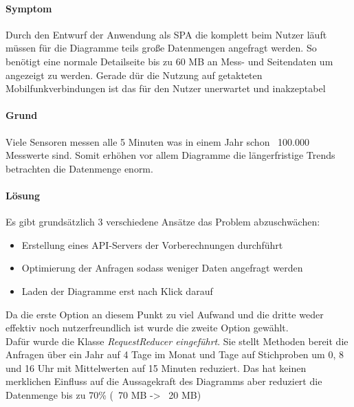 \paragraph{Symptom}
Durch den Entwurf der Anwendung als SPA die komplett beim Nutzer läuft müssen für die Diagramme teils große
Datenmengen angefragt werden. So benötigt eine normale Detailseite bis zu 60 MB an Mess- und Seitendaten um
angezeigt zu werden. Gerade dür die Nutzung auf getakteten Mobilfunkverbindungen ist das für den Nutzer
unerwartet und inakzeptabel

\paragraph{Grund}
Viele Sensoren messen alle 5 Minuten was in einem Jahr schon ~100.000 Messwerte sind.
Somit erhöhen vor allem Diagramme die längerfristige Trends betrachten die Datenmenge enorm.

\paragraph{Lösung}
Es gibt grundsätzlich 3 verschiedene Ansätze das Problem abzuschwächen:
\begin{itemize}
  \item Erstellung eines API-Servers der Vorberechnungen durchführt
  \item Optimierung der Anfragen sodass weniger Daten angefragt werden
  \item Laden der Diagramme erst nach Klick darauf
\end{itemize}

Da die erste Option an diesem Punkt zu viel Aufwand und die dritte weder effektiv noch
nutzerfreundlich ist wurde die zweite Option gewählt.\\
Dafür wurde die Klasse \emph{RequestReducer eingeführt}.
Sie stellt Methoden bereit die Anfragen über ein Jahr auf 4 Tage im Monat und Tage auf Stichproben
um 0, 8 und 16 Uhr mit Mittelwerten auf 15 Minuten reduziert. Das hat keinen merklichen Einfluss
auf die Aussagekraft des Diagramms aber reduziert die Datenmenge bis zu 70\% 
(~70 MB -> ~20 MB)
